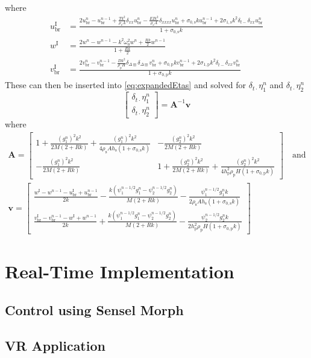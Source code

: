 where
\begin{subequations}\label{eq:intermediateColCol}
    \begin{align}
        u^\text{I}_\text{br}& = \frac{2u_\text{br}^n-u_\text{br}^{n-1}+\frac{Tk^2}{\rho_\text{s}A}\delta_{xx}u_\text{br}^n-\frac{EIk^2}{\rho_\text{s}A}\delta_{xxxx}u_\text{br}^n + \sigma_{0,\text{s}}ku_\text{br}^{n-1} + 2\sigma_{1,\text{s}}k^2\delta_{t-}\delta_{xx}u^n_\text{br}}{1 + \sigma_{0,\text{s}}k} \\
        w^\text{I} & = \frac{2w^n-w^{n-1}-k^2\omega_0^2w^n+\frac{Rk}{2}w^{n-1}}{1 + \frac{Rk}{2}}\\
        v^\text{I}_{\text{br}} & = \frac{2v_{\text{br}}^n-v_{\text{br}}^{n-1}-\frac{Dk^2}{\rho_\text{p}H}\delta_{\Delta\boxplus}\delta_{\Delta\boxplus}v_{\text{br}}^n+\sigma_{0,\text{p}}kv^{n-1}_\text{br}+ 2\sigma_{1,\text{p}}k^2\delta_{t-}\delta_{xx}v^n_\text{br}}{1+\sigma_{0,\text{p}}k}
    \end{align}
\end{subequations}
These can then be inserted into \eqref{eq:expandedEtas} and solved for $\delta_{t\cdot}\eta_1^n$ and $\delta_{t\cdot}\eta_2^n$
\begin{equation}
    \begin{bmatrix}
        \delta_{t\cdot}\eta_1^n\\
        \delta_{t\cdot}\eta_2^n
    \end{bmatrix}
    = 
    \mathbf{A}^{-1}\mathbf{v}
\end{equation}
where
\begin{equation}
\begin{gathered}
\mathbf{A} = 
    \begin{bmatrix}
        1 + \frac{(g_1^n)^2k^2}{2M(2+Rk)} + \frac{(g_1^n)^2k^2}{4\rho_\text{s}Ah_\text{s}(1+\sigma_{0,\text{s}}k)} & -\frac{(g_2^n)^2k^2}{2M(2+Rk)} \\
        -\frac{(g_1^n)^2k^2}{2M(2+Rk)} & 1+\frac{(g_2^n)^2k^2}{2M(2+Rk)}+\frac{(g_2^n)^2k^2}{4h_\text{p}^2\rho_\text{p}H(1+\sigma_{0,\text{p}}k)}
    \end{bmatrix}
    \quad \text{and}\\
    \mathbf{v} = 
    \begin{bmatrix}
        \frac{w^\text{I}-w^{n-1}-u_\text{br}^\text{I}+u_\text{br}^{n-1}}{2k} - \frac{k(\psi_1^{n-1/2}g_1^n-\psi_2^{n-1/2}g_2^n)}{M(2+Rk)}-\frac{\psi_1^{n-1/2}g_1^nk}{2\rho_\text{s}Ah_\text{s}(1+\sigma_{0,\text{s}}k)}\\
        \frac{v_\text{br}^\text{I}-v_\text{br}^{n-1}-w^\text{I}+w^{n-1}}{2k}+\frac{k(\psi_1^{n-1/2}g_1^n-\psi_2^{n-1/2}g_2^n)}{M(2+Rk)}-\frac{\psi_2^{n-1/2}g_2^nk}{2h_\text{p}^2\rho_\text{p}H(1+\sigma_{0,\text{p}}k)}
    \end{bmatrix}
    \nonumber
\end{gathered}
\end{equation}
\section{Real-Time Implementation}

\subsection{Control using Sensel Morph}

\subsection{VR Application}
